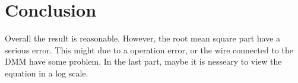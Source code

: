 \documentclass[aps,prl,reprint]{revtex4-1}
\begin{document}
\section{Conclusion}
Overall the result is reasonable. However, the root mean square part have a serious error. This might due to a operation error, or the wire connected to the DMM have some problem. In the last part, maybe it is nesseary to view the equation in a log scale.







\end{document}
